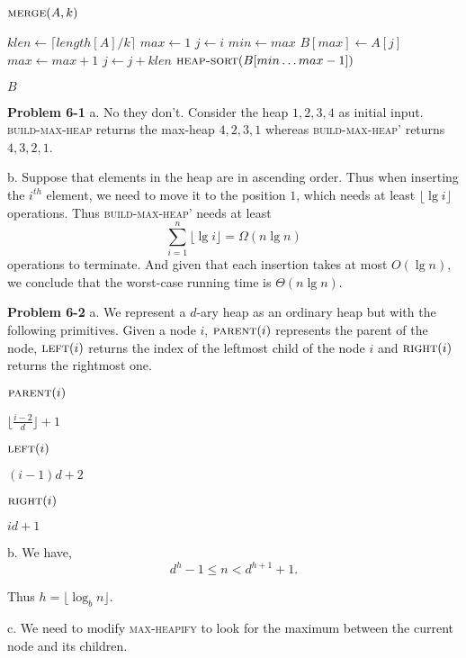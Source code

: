 \documentclass[a4paper,12pt]{article}
\newcommand{\newprob}[1]
{\bigskip \noindent \textbf{Problem #1} \newline}
\newcommand{\subpar}[1]{\medskip \noindent #1.}
\newcommand{\la}{\leftarrow}
\newenvironment{alg}[2]
               {\noindent $\textsc{#1}(#2)$ \begin{algorithmic}}
               {\end{algorithmic}}
\begin{document}
\begin{alg}{merge}{A, k}
  \STATE {}
  \STATE $klen \la \lceil length[A]/k\rceil$
  \STATE $max \la 1$
  \FOR{$i\la 1$ \textbf{to} $klen$}
  	\STATE $j \la i$
        \STATE $min \la max$
        	\STATE $B[max] \la A[j]$
                \STATE $max \la max+1$
                \STATE $j \la j+klen$
        \ENDWHILE
        \STATE $\textsc{heap-sort}(B[min\ldots max-1])$
  \ENDFOR

  \RETURN $B$
\end{alg}

\newprob{6-1}
\subpar{a} No they don't.  Consider the heap $1, 2, 3, 4$ as initial
input.  \textsc{build-max-heap} returns the max-heap $4, 2, 3, 1$
whereas \textsc{build-max-heap'} returns $4, 3, 2, 1$.

\subpar{b} Suppose that elements in the heap are in ascending order.
Thus when inserting the $i^{th}$ element, we need to move it to the
position $1$, which needs at least $\lfloor \lg i\rfloor$ operations.
Thus \textsc{build-max-heap'} needs at least
\[ \sum_{i=1}^n \lfloor \lg i\rfloor = \Omega(n\lg n) \]
operations to terminate.  And given that each insertion takes at most
$O(\lg n)$, we conclude that the worst-case running time is
$\Theta(n\lg n)$.

\newprob{6-2}
\subpar{a}  We represent a $d$-ary heap as an ordinary heap but with
the following primitives.  Given a node $i$, $\textsc{parent}(i)$
represents the parent of the node, $\textsc{left}(i)$ returns the
index of the leftmost child of the node $i$ and $\textsc{right}(i)$
returns the rightmost one.

\bigskip
\begin{alg}{parent}{i}
  \RETURN $\lfloor \frac{i-2}{d}\rfloor + 1$
\end{alg}

\newpage
\begin{alg}{left}{i}
  \RETURN $(i-1)d + 2$
\end{alg}

\medskip
\begin{alg}{right}{i}
  \RETURN $id +1$
\end{alg}

\subpar{b}  We have,
\[ d^h - 1 \le n < d^{h+1} + 1.\]

Thus $h = \lfloor \log_b n \rfloor$.

\subpar{c}  We need to modify \textsc{max-heapify} to look for the
maximum between the current node and its children.
\end{document}
